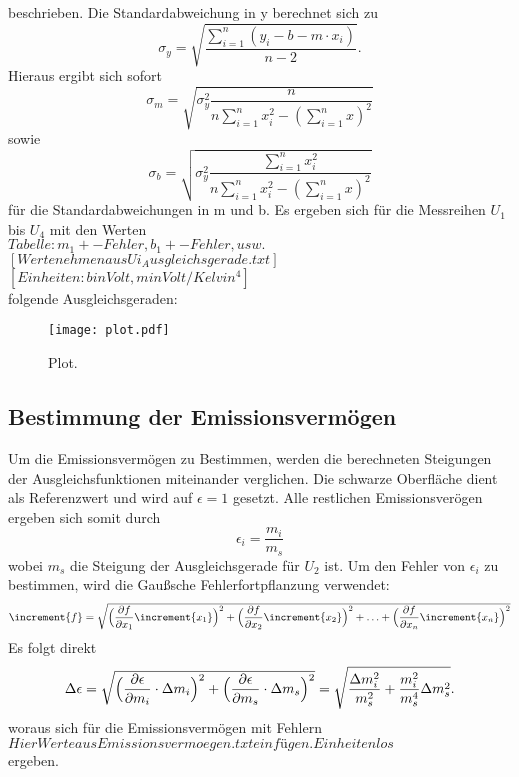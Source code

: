 beschrieben.
Die Standardabweichung in y berechnet sich zu
\begin{equation}
  \sigma_y = \sqrt{ \frac {\sum_{i=1}^n (y_i-b-m \cdot x_i)}{n-2} }.
\end{equation}
Hieraus ergibt sich sofort
\begin{equation}
  \sigma_m = \sqrt{ \sigma_y^2 \frac{n}{n \sum_{i=1}^n x_i^2 - (\sum_{i=1}^n x)^2} }
\end{equation}
sowie
\begin{equation}
  \sigma_b = \sqrt{ \sigma_y^2 \frac{\sum_{i=1}^n x_i^2}{n \sum_{i=1}^n x_i^2 - (\sum_{i=1}^n x)^2} }
\end{equation}
für die Standardabweichungen in m und b.
Es ergeben sich für die Messreihen $U_1$ bis $U_4$ mit den Werten
\\
$Tabelle: m_1 +- Fehler, b_1 +- Fehler, usw.$
$[Werte nehmen aus Ui_Ausgleichsgerade.txt]$
$[Einheiten: b in Volt, m in Volt/Kelvin^4]$
\\
folgende Ausgleichsgeraden:
\begin{figure}[H]
  \centering
  \texttt{[image: plot.pdf]}
  \caption{Plot.}
  \label{fig:plot}
\end{figure}

\cite{fehler}
\subsection{Bestimmung der Emissionsvermögen}
Um die Emissionsvermögen zu Bestimmen, werden die berechneten Steigungen der Ausgleichsfunktionen miteinander verglichen.
Die schwarze Oberfläche dient als Referenzwert und wird auf $\epsilon=1$ gesetzt.
Alle restlichen Emissionsverögen ergeben sich somit durch
\begin{equation}
  \epsilon_i = \frac{m_i}{m_s}
\end{equation}
wobei $m_s$ die Steigung der Ausgleichsgerade für $U_2$ ist.
Um den Fehler von $\epsilon_i$ zu bestimmen, wird die Gaußsche Fehlerfortpflanzung verwendet:
\begin{equation}
\increment{f} = \sqrt{\Bigl(\frac{\partial f}{\partial x_1}\increment{x_1}\Bigr)^2 + \Bigl(\frac{\partial f}{\partial x_2}\increment{x_2}\Bigr)^2 + \dotsc + \Bigl(\frac{\partial f}{\partial x_n}\increment{x_n}\Bigr)^2}
\end{equation}
Es folgt direkt
\begin{equation}
  \Delta\epsilon = \sqrt{ \Bigl( \frac{\partial \epsilon}{\partial m_i} \cdot \Delta m_i \Bigr)^2 +  \Bigl( \frac{\partial \epsilon}{\partial m_s} \cdot \Delta m_s  \Bigr)^2 } = \sqrt{ \frac{\Delta m_i ^2}{m_s^2} + \frac{m_i^2}{m_s^4} \Delta m_s^2 } .
\end{equation}
woraus sich für die Emissionsvermögen mit Fehlern
\\
$Hier Werte aus Emissionsvermoegen.txt einfügen. Einheitenlos $
\\
ergeben.
